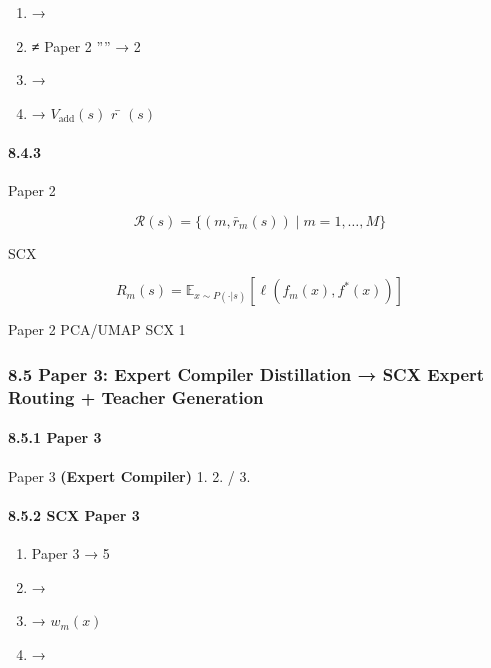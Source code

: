 \documentclass[
  12pt,
]{article}
\providecommand{\tightlist}{%
  \setlength{\itemsep}{0pt}\setlength{\parskip}{0pt}}
\begin{document}
\begin{enumerate}
\def\labelenumi{\arabic{enumi}.}
\tightlist
\item
  \textbf{} → 
\item
  \textbf{ ≠ }Paper 2 '''' →
   2
\item
  \textbf{} → 
\item
  \textbf{} → \(V_{\text{add}}(s)\)
   \(r̄(s)\)
\end{enumerate}

\paragraph{8.4.3 }\label{ux5f62ux5f0fux5316ux8fdeux63a5-1}

Paper 2 

\[
\mathcal{R}(s) = \{(m, \bar{r}_m(s)) \mid m = 1, \dots, M\}
\]

SCX 

\[
R_m(s) = \mathbb{E}_{x \sim P(\cdot|s)}[\ell(f_m(x), f^*(x))]
\]

Paper 2  PCA/UMAP  SCX  1

\subsubsection{8.5 Paper 3: Expert Compiler Distillation → SCX  Expert
Routing + Teacher
Generation}\label{paper-3-expert-compiler-distillation-scx-ux7684-expert-routing-teacher-generation}

\paragraph{8.5.1 Paper 3
}\label{paper-3-ux7684ux6838ux5fc3ux5185ux5bb9}

Paper 3 \textbf{ (Expert Compiler)} 1.
 2. / 3.


\paragraph{8.5.2 SCX  Paper 3
}\label{scx-ux4ece-paper-3-ux7ee7ux627fux7684ux6d1eux5bdf}

\begin{enumerate}
\def\labelenumi{\arabic{enumi}.}
\tightlist
\item
  \textbf{}Paper 3  →  5
\item
  \textbf{} → 
\item
  \textbf{} → \(w_m(x)\) 
\item
  \textbf{} → 
\end{enumerate}
\end{document}
